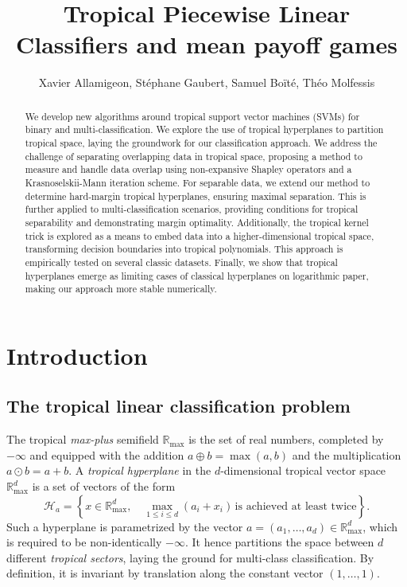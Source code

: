 \documentclass[oneside,english,a4paper]{amsart}
\numberwithin{equation}{section}
\numberwithin{figure}{section}
\theoremstyle{plain}
\theoremstyle{definition}
\theoremstyle{plain}
\theoremstyle{remark}
\theoremstyle{plain}
\theoremstyle{definition}
\theoremstyle{definition}
\begin{document}
\title{Tropical Piecewise Linear Classifiers and mean payoff games}
\author{Xavier Allamigeon, Stéphane Gaubert, Samuel Boïté, Théo Molfessis}
\maketitle

\begin{abstract}
    We develop new algorithms around tropical support vector machines (SVMs) for binary and multi-classification. We explore the use of tropical hyperplanes to partition tropical space, laying the groundwork for our classification approach. We address the challenge of separating overlapping data in tropical space, proposing a method to measure and handle data overlap using non-expansive Shapley operators and a Krasnoselskii-Mann iteration scheme. For separable data, we extend our method to determine hard-margin tropical hyperplanes, ensuring maximal separation. This is further applied to multi-classification scenarios, providing conditions for tropical separability and demonstrating margin optimality. Additionally, the tropical kernel trick is explored as a means to embed data into a higher-dimensional tropical space, transforming decision boundaries into tropical polynomials. This approach is empirically tested on several classic datasets. Finally, we show that tropical hyperplanes emerge as limiting cases of classical hyperplanes on logarithmic paper, making our approach more stable numerically.
\end{abstract}

\section{Introduction}

\subsection*{The tropical linear classification problem}


The tropical \emph{max-plus} semifield $\mathbb{R}_{\max}$ is the
set of real numbers, completed by $-\infty$ and equipped with the
addition $a\oplus b=\max(a,b)$ and the multiplication $a\odot b=a+b$.
A \emph{tropical hyperplane} in the $d$-dimensional tropical vector
space $\mathbb{R}_{\max}^{d}$ is a set of vectors of the form
\[
\mathcal{H}_{a}=\left\{x\in\mathbb{R}_{\max}^{d},\quad\max_{1\le i\le d}(a_{i}+x_{i})\,\text{is achieved at least twice}\right\}.
\]
Such a hyperplane is parametrized by the vector $a=(a_{1},\ldots,a_{d})\in\mathbb{R}_{\max}^{d}$,
which is required to be non-identically $-\infty$. It hence partitions
the space between $d$ different \emph{tropical sectors}, laying the
ground for multi-class classification. By definition, it is invariant by translation along the constant vector $(1,\ldots, 1)$.
\end{document}

